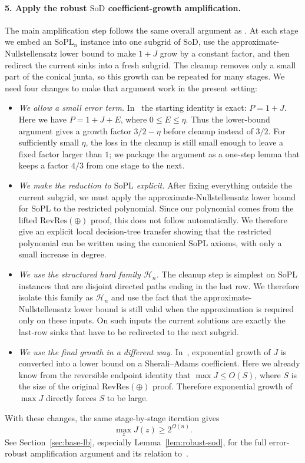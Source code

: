 \documentclass[11pt]{article}
\theoremstyle{definition}
\newcommand{\RevRes}{\mathrm{RevRes}}
\newcommand{\SoPL}{\mathrm{SoPL}}
\newcommand{\SoD}{\mathrm{SoD}}
\begin{document}
\paragraph{5. Apply the robust $\SoD$ coefficient-growth amplification.}
The main amplification step follows the same overall argument as
\cite[Section~5.1]{GHJMPRT}.  At each stage we embed an $\SoPL_n$ instance into one
subgrid of $\SoD$, use the approximate-Nullstellensatz lower bound to make $1+J$
grow by a constant factor, and then redirect the current sinks into a fresh subgrid.
The cleanup removes only a small part of the conical junta, so this growth can be
repeated for many stages.  We need four changes to make that argument work in the
present setting:
\begin{itemize}[leftmargin=2em,itemsep=3pt,topsep=3pt]
\item \emph{We allow a small error term.}
In~\cite{GHJMPRT} the starting identity is exact: $P=1+J$.  Here we have
$P=1+J+E$, where $0\le E\le\eta$.  Thus the lower-bound argument gives a growth
factor $3/2-\eta$ before cleanup instead of $3/2$.  For sufficiently small $\eta$,
the loss in the cleanup is still small enough to leave a fixed factor larger than
$1$; we package the argument as a one-step lemma that keeps a factor $4/3$ from one
stage to the next.

\item \emph{We make the reduction to $\SoPL$ explicit.}
After fixing everything outside the current subgrid, we must apply the
approximate-Nullstellensatz lower bound for $\SoPL$ to the restricted polynomial.
Since our polynomial comes from the lifted $\RevRes(\oplus)$ proof, this does not
follow automatically.  We therefore give an explicit local decision-tree transfer
showing that the restricted polynomial can be written using the canonical $\SoPL$
axioms, with only a small increase in degree.

\item \emph{We use the structured hard family $\mathcal H_n$.}
The cleanup step is simplest on $\SoPL$ instances that are disjoint directed paths
ending in the last row.  We therefore isolate this family as $\mathcal H_n$ and use
the fact that the approximate-Nullstellensatz lower bound is still valid when the
approximation is required only on these inputs.  On such inputs the current solutions
are exactly the last-row sinks that have to be redirected to the next subgrid.

\item \emph{We use the final growth in a different way.}
In~\cite{GHJMPRT}, exponential growth of $J$ is converted into a lower bound on a
Sherali--Adams coefficient.  Here we already know from the reversible endpoint
identity that $\max J\le O(S)$, where $S$ is the size of the original
$\RevRes(\oplus)$ proof.  Therefore exponential growth of $\max J$ directly forces
$S$ to be large.
\end{itemize}
With these changes, the same stage-by-stage iteration gives
\[
  \max_z J(z)\ge 2^{\Omega(n)}.
\]
See Section~\ref{sec:base-lb}, especially Lemma~\ref{lem:robust-sod}, for the full
error-robust amplification argument and its relation to~\cite[Section~5.1]{GHJMPRT}.
\end{document}
